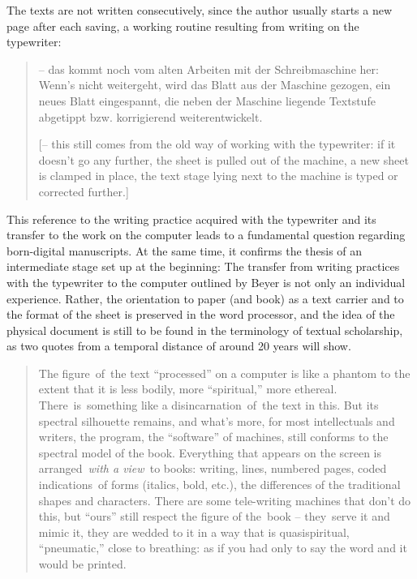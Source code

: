 \begin{paper}
The texts are not written consecutively, since the author usually starts
a new page after each saving, a working routine resulting from writing
on the typewriter:

\begin{quote}
-- das kommt noch vom alten Arbeiten mit der Schreibmaschine her: Wenn's
nicht weitergeht, wird das Blatt aus der Maschine gezogen, ein neues
Blatt eingespannt, die neben der Maschine liegende Textstufe abgetippt
bzw. korrigierend weiterentwickelt.

\vspace{1em}

[-- this still comes from the old way of working with the typewriter: if
it doesn't go any further, the sheet is pulled out of the machine, a new
sheet is clamped in place, the text stage lying next to the machine is
typed or corrected further.] 
\begin{flushright}
    \parencite{beyer_e-mail_2015}
\end{flushright} 
\end{quote}

This reference to the writing practice acquired with the typewriter and
its transfer to the work on the computer leads to a fundamental question
regarding born-digital manuscripts. At the same time, it confirms the
thesis of an intermediate stage set up at the beginning: The transfer
from writing practices with the typewriter to the computer outlined by
Beyer is not only an individual experience. Rather, the orientation to
paper (and book) as a text carrier and to the format of the sheet is
preserved in the word processor, and the idea of the physical document
is still to be found in the terminology of textual scholarship, as two
quotes from a temporal distance of around 20 years will show.

\begin{quote}
The figure~of~the text ``processed'' on a computer is like a phantom to
the extent that it is less bodily, more ``spiritual,'' more ethereal.
There~is~something like a disincarnation~of~the text in this. But its
spectral silhouette remains, and what's more, for most intellectuals and
writers, the program, the ``software'' of machines, still conforms to
the spectral model of the book. Everything that appears on the screen is
arranged~\emph{with a view~}to books: writing, lines, numbered pages,
coded indications~of forms (italics, bold, etc.), the differences of the
traditional shapes and characters. There are some tele-writing machines
that don't do this, but ``ours'' still respect the figure of the~book --
they~serve it and mimic it, they are wedded to it in a way that is
quasispiritual, ``pneumatic,'' close to breathing: as if you had only to
say the word and it would be printed.~
\begin{flushright}
    \parencite[30]{derrida_paper_2005}
\end{flushright} 


\end{quote}
\end{paper}

